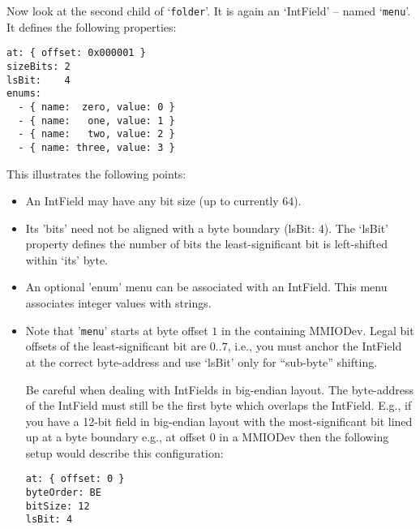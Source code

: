 \documentclass[10pt]{article}
\newcommand{\cod}[1] {{\tt#1}}
\begin{document}
Now look at the second child of `\cod{folder}'. It is again an `IntField' -- named
`\cod{menu}'.  It defines the following properties:
\begin{verbatim}
at: { offset: 0x000001 }
sizeBits: 2
lsBit:    4
enums:
  - { name:  zero, value: 0 }
  - { name:   one, value: 1 }
  - { name:   two, value: 2 }
  - { name: three, value: 3 }
\end{verbatim}
This illustrates the following points:
\begin{itemize}
\item An IntField may have any bit size (up to currently 64).
\item Its 'bits' need not be aligned with a byte boundary (lsBit: 4). The
      `lsBit' property defines the number of bits the least-significant bit
      is left-shifted within `its' byte.
\item An optional 'enum' menu can be associated with an IntField. This
      menu associates integer values with strings.
\item Note that '\cod{menu}' starts at byte offset $1$ in the containing MMIODev.
      Legal bit offsets of the least-significant bit are $0..7$, i.e., you
      must anchor the IntField at the correct byte-address and use `lsBit'
      only for ``sub-byte'' shifting.

      Be careful when dealing with IntFields in big-endian layout. The byte-address
      of the IntField must still be the first byte which overlaps the IntField. E.g.,
      if you have a 12-bit field in big-endian layout with the most-significant
      bit lined up at a byte boundary e.g., at offset $0$ in a MMIODev then the
      following setup would describe this configuration:
\begin{verbatim}
at: { offset: 0 }
byteOrder: BE
bitSize: 12
lsBit: 4
\end{verbatim}
\end{itemize}
\end{document}

